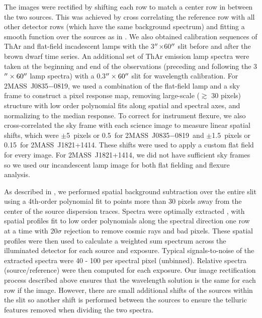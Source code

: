 \documentclass[twocolumn]{aastex6}
\newcommand{\sha}{2MASS~J0835$-$0819}
\newcommand{\shb}{2MASS~J1821+1414}
\begin{document}
The images were rectified by shifting each row to match a center row in between the two sources.
This was achieved by cross correlating the reference row with all other detector rows (which have the same background spectrum) and fitting a smooth function over the sources as in \citealt{2016ApJ...826..156S}.
We also obtained calibration sequences of ThAr and flat-field incadescent lamps with the 3$\mbox{$^{\prime\prime}$}$$\times$60$\mbox{$^{\prime\prime}$}$ slit  before and after the brown dwarf time series.
An additional set of ThAr emission lamp spectra were taken at the beginning and end of the observations (preceding and following the 3$\mbox{$^{\prime\prime}$} \times 60 \mbox{$^{\prime\prime}$}$ lamp spectra) with a 0.3$\mbox{$^{\prime\prime}$}\times60\mbox{$^{\prime\prime}$}$ slit for wavelength calibration.
For {\sha}, we used a combination of the flat-field lamp and a sky frame to construct a pixel response map, removing large-scale ($\gtrsim$ 30 pixels) structure with low order polynomial fits along spatial and spectral axes, and normalizing to the median response. 
To correct for instrument flexure, we also cross-correlated the sky frame with each science image to measure linear spatial shifts, which were $\pm$5~pixels or 0.5\arcsec\ for \sha\ and $\pm$1.5~pixels or 0.15\arcsec\ for \shb.
These shifts were used to apply a custom flat field for every image.
For {\shb}, we did not have sufficient sky frames so we used our incandescent lamp image for both flat fielding and flexure analysis.

As described in \citet{2016ApJ...826..156S}, we performed spatial background subtraction over the entire slit using a 4th-order polynomial fit to points more than 30 pixels away from the center of the source dispersion traces.  Spectra were optimally extracted \citep{1986ApJ...302..757H}, with spatial profiles fit to low order polynomials along the spectral direction one row at a time with 20$\sigma$ rejection to remove cosmic rays and bad pixels.
These spatial profiles were then used to calculate a weighted sum spectrum across the illuminated detector for each source and exposure. 
Typical signals-to-noise of the extracted spectra were 40 - 100 per spectral pixel (unbinned).
Relative spectra (source/reference) were then computed for each exposure.
Our image rectification process described above ensures that the wavelength solution is the same for each row if the image.
However, there are small additional shifts of the sources within the slit so another shift is performed between the sources to ensure the telluric features removed when dividing the two spectra.
\end{document}
